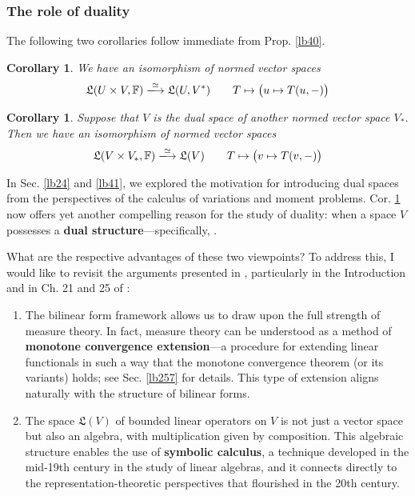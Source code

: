 \documentclass[12pt,b5paper,notitlepage]{article}
\theoremstyle{definition}
\theoremstyle{plain}
\newtheorem{co}[df]{Corollary}
\newcommand{\fk}{\mathfrak}
\newcommand{\Fbb}{\mathbb F}
\numberwithin{equation}{section}
\begin{document}
\subsubsection{The role of duality}\label{lb132}


The following two corollaries follow immediate from Prop. \ref{lb40}.

\begin{co}\label{lb134}
We have an isomorphism of normed vector spaces
\begin{gather}
\fk L(U\times V,\Fbb)\xlongrightarrow{\simeq}\fk L(U,V^*)\qquad T\mapsto\big(u\mapsto T(u,-)\big)
\end{gather}
\end{co}


\begin{co}\label{lb42}
Suppose that $V$ is the dual space of another normed vector space $V_*$. Then we have an isomorphism of normed vector spaces
\begin{gather}
\fk L(V\times V_*,\Fbb)\xlongrightarrow{\simeq}\fk L(V)\qquad T\mapsto\big(v\mapsto T(v,-)\big)
\end{gather}
\end{co}


In Sec. \ref{lb24} and \ref{lb41}, we explored the motivation for introducing dual spaces from the perspectives of the calculus of variations and moment problems. Cor. \ref{lb42} now offers yet another compelling reason for the study of duality: when a space $V$ possesses a \textbf{dual structure}---specifically, . 

What are the respective advantages of these two viewpoints? To address this, I would like to revisit the arguments presented in \cite{Gui-A}, particularly in the Introduction and in Ch. 21 and 25 of \cite{Gui-A}:


\begin{enumerate}
\item The bilinear form framework allows us to draw upon the full strength of measure theory. In fact, measure theory can be understood as a method of \textbf{monotone convergence extension}---a procedure for extending linear functionals in such a way that the monotone convergence theorem (or its variants) holds; see Sec. \ref{lb257} for details.  This type of extension aligns naturally with the structure of bilinear forms.
\item The space $\fk L(V)$ of bounded linear operators on $V$ is not just a vector space but also an algebra, with multiplication given by composition. This algebraic structure enables the use of \textbf{symbolic calculus}, a technique developed in the mid-19th century in the study of linear algebras, and it connects directly to the representation-theoretic perspectives that flourished in the 20th century.
\end{enumerate}
\end{document}

